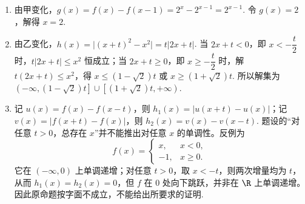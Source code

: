 \begin{solution}
\begin{enumerate}
\item 由甲变化，\(g(x)=f(x)-f(x-1)=2^x-2^{x-1}=2^{x-1}\). 令 \(g(x)=2\)，解得 \(x=2\).
\item 由乙变化，\(h(x)=\lvert(x+t)^2-x^2\rvert=t\lvert2x+t\rvert\). 当 \(2x+t<0\)，即 \(x<-\dfrac t2\) 时，\(t\lvert2x+t\rvert\le x^2\) 恒成立；当 \(2x+t\ge0\)，即 \(x\ge-\dfrac t2\) 时，解 \(t(2x+t)\le x^2\)，得 \(x\le(1-\sqrt2)t\) 或 \(x\ge(1+\sqrt2)t\). 所以解集为 \(\left(-\infty,(1-\sqrt2)t\right]\cup\left[(1+\sqrt2)t,+\infty\right)\).
\item 记 \(u(x)=f(x)-f(x-t)\)，则 \(h_1(x)=\lvert u(x+t)-u(x)\rvert\)；记 \(v(x)=\lvert f(x+t)-f(x)\rvert\)，则 \(h_2(x)=v(x)-v(x-t)\). 题设的“对任意 \(t>0\)，总存在 \(x\)”并不能推出对任意 \(x\) 的单调性。反例为
\[
f(x)=\begin{cases}x,&x<0,\\-1,&x\ge0.\end{cases}
\]
它在 \((-\infty,0)\) 上单调递增；对任意 \(t>0\)，取 \(x<-t\)，则两次增量均为 \(t\)，从而 \(h_1(x)=h_2(x)=0\)，但 \(f\) 在 \(0\) 处向下跳跃，并非在 \(\R\) 上单调递增。因此原命题按字面不成立，不能给出所要求的证明.
\end{enumerate}
\end{solution}
